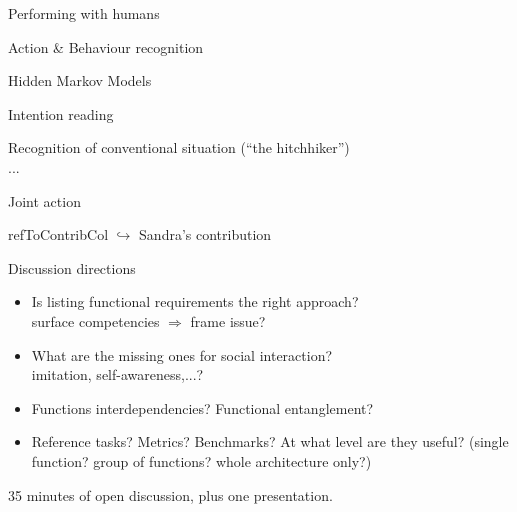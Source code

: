 \documentclass[compress]{beamer}
\newcommand{\refToContrib}[1]{%
    \begin{beamercolorbox}[wd=\linewidth,ht=2ex,dp=0.7ex]{refToContribCol}%
    \hspace{0.5em}$\hookrightarrow$ #1%
    \end{beamercolorbox}%
}%
\begin{document}
\begin{frame}{Performing with humans}

    \begin{multicols}{2}
    \vfill
    \columnbreak

    


    {\Medium Action \& Behaviour recognition}

    Hidden Markov Models

    {\Medium Intention reading}

    Recognition of conventional situation (``the hitchhiker'')\\
    ...


    {\Medium Joint action}
    \refToContrib{Sandra's contribution}
    


    \end{multicols}

\end{frame}

\begin{frame}{Discussion directions}
    

    \begin{itemize}
        \item Is listing functional requirements the right approach?\\ {\Medium surface competencies $\Rightarrow$ frame issue?}
        \item What are the missing ones for social interaction?\\ {\Medium imitation, self-awareness,...?}
        \item Functions interdependencies? Functional entanglement?
        \item Reference tasks? Metrics? Benchmarks? At what level are they useful? (single function? group of functions? whole architecture only?)
    \end{itemize}

    35 minutes of open discussion, plus one presentation.

\end{frame}
\end{document}
